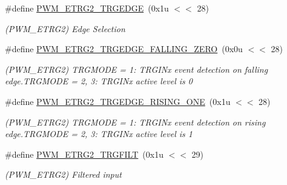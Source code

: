 \begin{DoxyCompactItemize}
\mbox{\label{group__SAME70__PWM_gad870723726d1dcc162f83d624855b12b}} 
\#define \mbox{\hyperlink{group__SAME70__PWM_gad870723726d1dcc162f83d624855b12b}{P\+W\+M\+\_\+\+E\+T\+R\+G2\+\_\+\+T\+R\+G\+E\+D\+GE}}~(0x1u $<$$<$ 28)
\begin{DoxyCompactList}\small\item\em (P\+W\+M\+\_\+\+E\+T\+R\+G2) Edge Selection \end{DoxyCompactList}\item 
\mbox{\label{group__SAME70__PWM_ga934e06adba09c635569c96f999d80f0a}} 
\#define \mbox{\hyperlink{group__SAME70__PWM_ga934e06adba09c635569c96f999d80f0a}{P\+W\+M\+\_\+\+E\+T\+R\+G2\+\_\+\+T\+R\+G\+E\+D\+G\+E\+\_\+\+F\+A\+L\+L\+I\+N\+G\+\_\+\+Z\+E\+RO}}~(0x0u $<$$<$ 28)
\begin{DoxyCompactList}\small\item\em (P\+W\+M\+\_\+\+E\+T\+R\+G2) T\+R\+G\+M\+O\+DE = 1\+: T\+R\+G\+I\+Nx event detection on falling edge.\+T\+R\+G\+M\+O\+DE = 2, 3\+: T\+R\+G\+I\+Nx active level is 0 \end{DoxyCompactList}\item 
\mbox{\label{group__SAME70__PWM_ga60b0ef66c25c92f2cb53dc982aa679c9}} 
\#define \mbox{\hyperlink{group__SAME70__PWM_ga60b0ef66c25c92f2cb53dc982aa679c9}{P\+W\+M\+\_\+\+E\+T\+R\+G2\+\_\+\+T\+R\+G\+E\+D\+G\+E\+\_\+\+R\+I\+S\+I\+N\+G\+\_\+\+O\+NE}}~(0x1u $<$$<$ 28)
\begin{DoxyCompactList}\small\item\em (P\+W\+M\+\_\+\+E\+T\+R\+G2) T\+R\+G\+M\+O\+DE = 1\+: T\+R\+G\+I\+Nx event detection on rising edge.\+T\+R\+G\+M\+O\+DE = 2, 3\+: T\+R\+G\+I\+Nx active level is 1 \end{DoxyCompactList}\item 
\mbox{\label{group__SAME70__PWM_ga7abd54fd12e1034101295c7f1517ad99}} 
\#define \mbox{\hyperlink{group__SAME70__PWM_ga7abd54fd12e1034101295c7f1517ad99}{P\+W\+M\+\_\+\+E\+T\+R\+G2\+\_\+\+T\+R\+G\+F\+I\+LT}}~(0x1u $<$$<$ 29)
\begin{DoxyCompactList}\small\item\em (P\+W\+M\+\_\+\+E\+T\+R\+G2) Filtered input \end{DoxyCompactList}\item 
\mbox{\label{group__SAME70__PWM_ga4f0be694bd13e2e7e8638e7f3b96b631}} 

\end{DoxyCompactItemize}
